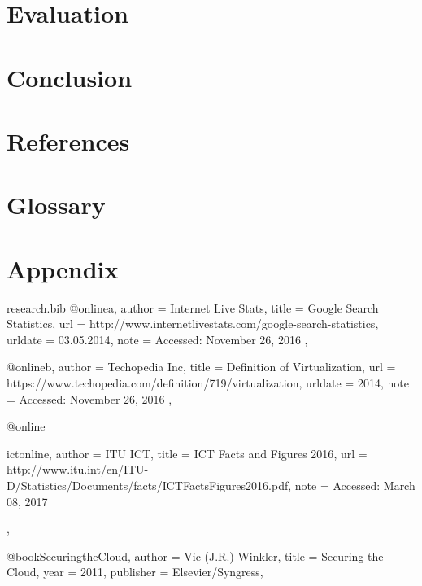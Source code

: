 \documentclass{article}
\begin{document}
  \newpage
  \section{Evaluation}

  \newpage
  \section{Conclusion}

  \newpage
  \section{References}
	
	\renewcommand{\bibname}{}
  \section{Glossary}
  \newpage
  \section{Appendix}
	
	\begin{filecontents*}{research.bib}
		@online{a,
			author = {Internet Live Stats},
			title = {Google Search Statistics},
			url = {http://www.internetlivestats.com/google-search-statistics},
			urldate = {03.05.2014},
			note = {Accessed: November 26, 2016}
		},
	
		@online{b,
			author = {Techopedia Inc},
			title = {Definition of Virtualization},
			url = {https://www.techopedia.com/definition/719/virtualization},
			urldate = {2014},
			note = {Accessed: November 26, 2016}
		},
	
		@online{ictonline,
			author = {ITU ICT},
			title = {ICT Facts and Figures 2016},
			url = {http://www.itu.int/en/ITU-D/Statistics/Documents/facts/ICTFactsFigures2016.pdf},
			note = {Accessed: March 08, 2017}

		},
	
		@book{SecuringtheCloud,
			author    = {Vic (J.R.) Winkler},
			title     = {Securing the Cloud},
			year      = {2011},
			publisher = {Elsevier/Syngress},
		}

		
	\end{filecontents*}

	
\end{document}
